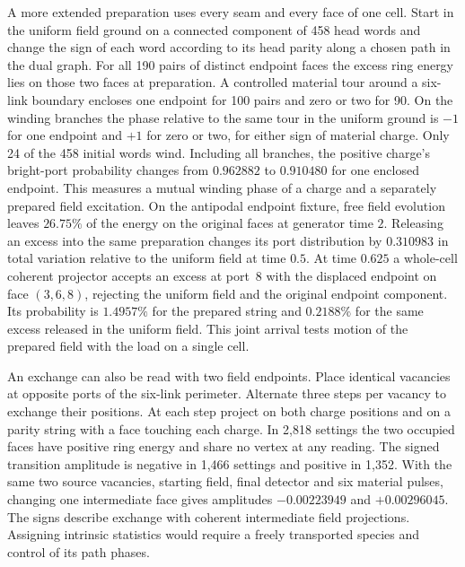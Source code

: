 A more extended preparation uses every seam and every face of one cell.
Start in the uniform field ground on a connected component of 458 head
words and change the sign of each word according to its head parity
along a chosen path in the dual graph. For all 190 pairs of distinct
endpoint faces the excess ring energy lies on those two faces at
preparation. A controlled material tour around a six-link boundary
encloses one endpoint for 100 pairs and zero or two for 90. On the
winding branches the phase relative to the same tour in the uniform
ground is $-1$ for one endpoint and $+1$ for zero or two, for either
sign of material charge. Only 24 of the 458 initial words wind. Including
all branches, the positive charge's bright-port probability changes
from $0.962882$ to $0.910480$ for one enclosed endpoint. This measures a
mutual winding phase of a charge and a separately prepared field
excitation. On the antipodal endpoint fixture, free field evolution
leaves $26.75\%$ of the energy on the original faces at generator time
$2$. Releasing an excess into the same preparation changes its port
distribution by $0.310983$ in total variation relative to the uniform
field at time $0.5$. At time $0.625$ a whole-cell coherent projector
accepts an excess at port~8 with the displaced endpoint on face
$(3,6,8)$, rejecting the uniform field and the original endpoint component. Its probability
is $1.4957\%$ for the prepared string and $0.2188\%$ for the same
excess released in the uniform field. This joint arrival tests motion
of the prepared field with the load on a single cell.

An exchange can also be read with two field endpoints. Place identical
vacancies at opposite ports of the six-link perimeter. Alternate three
steps per vacancy to exchange their positions. At each step project
on both charge positions and on a parity string with a face touching
each charge. In 2,818 settings the two occupied faces have positive
ring energy and share no vertex at any reading. The signed transition
amplitude is negative in 1,466 settings and positive in 1,352. With
the same two source vacancies, starting field, final detector and six
material pulses, changing one intermediate face gives amplitudes
$-0.00223949$ and $+0.00296045$. The signs describe exchange with
coherent intermediate field projections. Assigning intrinsic statistics
would require a freely transported species and control of its path phases.

